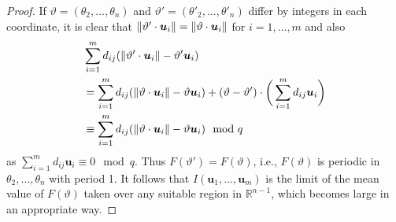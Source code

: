 \documentclass[11pt]{article}
\theoremstyle{definition}
\theoremstyle{proof}
\begin{document}
\begin{proof}
    If $\vartheta = (\theta _2, \ldots, \theta _n)$ and $\vartheta '= (\theta '_2, \ldots, \theta '_n)$ differ by integers in each coordinate, it is clear that $\norm{\vartheta ' \cdot \bm{u}_i} = \norm{\vartheta \cdot \bm{u}_i}$ for $i=1, \ldots, m$ and also
    \begin{align*}
        & \sum\limits_{i=1}^{m} d_{ij} (\norm{\vartheta ' \cdot \bm{u}_i} - \vartheta ' \bm{u}_i) \\
        &= \sum\limits_{i=1}^{m} d_{ij} (\norm{\vartheta \cdot \bm{u}_i} - \vartheta \bm{u}_i) + (\vartheta - \vartheta ') \cdot \bigg(\sum\limits_{i=1}^{m} d_{ij} \bm{u}_i \bigg) \\
        &\equiv \sum\limits_{i=1}^{m} d_{ij} (\norm{\vartheta \cdot \bm{u}_i} - \vartheta \bm{u}_i) \mod q
    \end{align*}
    as $\sum\limits_{i=1}^{m} d_{ij} \bm{u}_i \equiv 0 \mod q$.
    Thus $F(\vartheta ' ) = F(\vartheta )$, i.e., $F(\vartheta )$ is periodic in $\theta _2, \ldots, \theta _{n}$ with period 1.
    It follows that $I(\bm{u}_1, \ldots, \bm{u}_m)$ is the limit of the mean value of $F(\vartheta )$ taken over any suitable region in $\mathbb{R}^{n-1}$, which becomes large in an appropriate way.


\end{proof}
\end{document}

